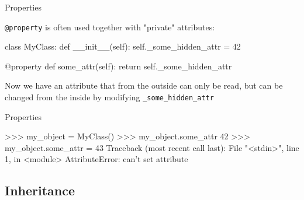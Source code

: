 \begin{frame}[fragile]{Properties}

    {\tt @property} is often used together with "private" attributes:

    \vspace{1em}

    \begin{pythoncode}
    class MyClass:
        def __init__(self):
            self._some_hidden_attr = 42

        @property
        def some_attr(self):
            return self._some_hidden_attr
    \end{pythoncode}

    \vspace{1em}

    Now we have an attribute that from the outside can only be read, but can be changed from the inside by modifying {\tt \_some\_hidden\_attr}


\end{frame}

\begin{frame}[fragile]{Properties}

    \begin{outputcode}
    >>> my_object = MyClass()
    >>> my_object.some_attr
    42
    >>> my_object.some_attr = 43
    Traceback (most recent call last):
      File "<stdin>", line 1, in <module>
    AttributeError: can't set attribute
\end{outputcode}

\end{frame}

\subsection{Inheritance}

